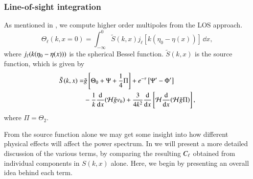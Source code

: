 \subsubsection{Line-of-sight integration}\label{sssec:M4:theory:line_of_sight_integration}
As mentioned in , we compute higher order multipoles from the LOS approach. 
\begin{equation} \label{eq:M4:theory:Theta_ell_LOS_integration}
    \Theta_\ell(k,x=0) = \int_{-\infty}^0 \tilde{S}(k,x) j_\ell [k(\eta_0 - \eta(x))]\,\dd x, 
\end{equation}
where $j_\ell(k(\eta_0-\eta(x)))$ is the spherical Bessel function. $\tilde{S}(k,x)$ is the source function, which is given by 
\begin{equation} \label{eq:M4:theory:source_function_LOS}
    \begin{split}
        \tilde{S}(k,x) =& \tilde{g} \left[ \Theta_0 + \Psi + \frac{1}{4} \Pi \right] + e^{-\tau}\left[ \Psi' - \Phi' \right] \\
        & - \frac{1}{k}\dv{x}(\mathcal{H} \tilde{g} v_b) + \frac{3}{4k^2}\dv{x}\left[ \mathcal{H} \dv{x}(\mathcal{H}\tilde{g}\Pi) \right],
    \end{split}
\end{equation}
where $\Pi=\Theta_2$.

From the source function alone we may get some insight into how different physical effects will affect the power spectrum. In  we will present a more detailed discussion of the various terms, by comparing the resulting $C_\ell$ obtained from individual components in $S(k,x)$ alone. Here, we begin by presenting an overall idea behind each term.  

